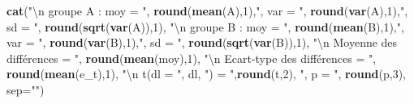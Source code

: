 \documentclass[
  11pt,
  french,
]{book}
\makeatletter
\newenvironment{Shaded}{\begin{snugshade}}{\end{snugshade}}
\newcommand{\CharTok}[1]{\textcolor[rgb]{0.31,0.60,0.02}{#1}}
\newcommand{\DataTypeTok}[1]{\textcolor[rgb]{0.13,0.29,0.53}{#1}}
\newcommand{\DecValTok}[1]{\textcolor[rgb]{0.00,0.00,0.81}{#1}}
\newcommand{\KeywordTok}[1]{\textcolor[rgb]{0.13,0.29,0.53}{\textbf{#1}}}
\newcommand{\NormalTok}[1]{#1}
\newcommand{\StringTok}[1]{\textcolor[rgb]{0.31,0.60,0.02}{#1}}
\newenvironment{kframe}{%
\medskip{}
\setlength{\fboxsep}{.8em}
 \def\at@end@of@kframe{}%
 \ifinner\ifhmode%
  \def\at@end@of@kframe{\end{minipage}}%
  \begin{minipage}{\columnwidth}%
 \fi\fi%
 \def\FrameCommand##1{\hskip\@totalleftmargin \hskip-\fboxsep
 \colorbox{shadecolor}{##1}\hskip-\fboxsep
     \hskip-\linewidth \hskip-\@totalleftmargin \hskip\columnwidth}%
 \MakeFramed {\advance\hsize-\width
   \@totalleftmargin\z@ \linewidth\hsize
   \@setminipage}}%
 {\par\unskip\endMakeFramed%
 \at@end@of@kframe}
\renewenvironment{Shaded}{\begin{kframe}}{\end{kframe}}
\makeatother
\begin{document}
\begin{Shaded}
\begin{Highlighting}[]
  \KeywordTok{cat}\NormalTok{(}\StringTok{"}\CharTok{\textbackslash{}n}\StringTok{ groupe A : moy = "}\NormalTok{, }\KeywordTok{round}\NormalTok{(}\KeywordTok{mean}\NormalTok{(A),}\DecValTok{1}\NormalTok{),}\StringTok{", var = "}\NormalTok{, }
         \KeywordTok{round}\NormalTok{(}\KeywordTok{var}\NormalTok{(A),}\DecValTok{1}\NormalTok{),}\StringTok{", sd = "}\NormalTok{, }\KeywordTok{round}\NormalTok{(}\KeywordTok{sqrt}\NormalTok{(}\KeywordTok{var}\NormalTok{(A)),}\DecValTok{1}\NormalTok{),}
      \StringTok{"}\CharTok{\textbackslash{}n}\StringTok{ groupe B : moy = "}\NormalTok{, }\KeywordTok{round}\NormalTok{(}\KeywordTok{mean}\NormalTok{(B),}\DecValTok{1}\NormalTok{),}\StringTok{", var = "}\NormalTok{, }
         \KeywordTok{round}\NormalTok{(}\KeywordTok{var}\NormalTok{(B),}\DecValTok{1}\NormalTok{),}\StringTok{", sd = "}\NormalTok{, }\KeywordTok{round}\NormalTok{(}\KeywordTok{sqrt}\NormalTok{(}\KeywordTok{var}\NormalTok{(B)),}\DecValTok{1}\NormalTok{),}
      \StringTok{"}\CharTok{\textbackslash{}n}\StringTok{ Moyenne des différences = "}\NormalTok{, }\KeywordTok{round}\NormalTok{(}\KeywordTok{mean}\NormalTok{(moy),}\DecValTok{1}\NormalTok{),}
      \StringTok{"}\CharTok{\textbackslash{}n}\StringTok{ Ecart-type des différences = "}\NormalTok{, }\KeywordTok{round}\NormalTok{(}\KeywordTok{mean}\NormalTok{(e_t),}\DecValTok{1}\NormalTok{),}
      \StringTok{"}\CharTok{\textbackslash{}n}\StringTok{ t(dl = "}\NormalTok{, dl, }\StringTok{") = "}\NormalTok{,}\KeywordTok{round}\NormalTok{(t,}\DecValTok{2}\NormalTok{),}
      \StringTok{", p = "}\NormalTok{, }\KeywordTok{round}\NormalTok{(p,}\DecValTok{3}\NormalTok{),  }\DataTypeTok{sep=}\StringTok{""}\NormalTok{)}
  

\end{Highlighting}
\end{Shaded}
\end{document}
